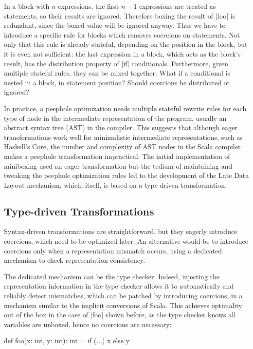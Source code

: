 In a block with $n$ expressions, the first $n-1$ expressions are treated as statements, so their results are ignored. Therefore boxing the result of |foo| is redundant, since the boxed value will be ignored anyway. Thus we have to introduce a specific rule for blocks which removes coercions on statements. Not only that this rule is already stateful, depending on the position in the block, but it is even not sufficient: the last expression in a block, which acts as the block's result, has the distribution property of |if| conditionals. Furthermore, given multiple stateful rules, they can be mixed together: What if a conditional is nested in a block, in statement position? Should coercions be distributed or ignored?

In practice, a peephole optimization needs multiple stateful rewrite rules for each type of node in the intermediate representation of the program, usually an abstract syntax tree (AST) in the compiler. This suggests that although eager transformations work well for minimalistic intermediate representations, such as Haskell's Core, the number and complexity of AST nodes in the Scala compiler makes a peephole transformation impractical. The initial implementation of miniboxing \cite{miniboxing} used an eager transformation but the tedium of maintaining and tweaking the peephole optimization rules led to the development of the Late Data Layout mechanism, which, itself, is based on a type-driven transformation.

\subsection{Type-driven Transformations}
\label{sec:problem/lazy}

Syntax-driven transformations are straightforward, but they eagerly introduce coercions, which need to be optimized later. An alternative would be to introduce coercions only when a representation mismatch occurs, using a dedicated mechanism to check representation consistency.

The dedicated mechanism can be the type checker. Indeed, injecting the representation information in the type checker allows it to automatically and reliably detect mismatches, which can be patched by introducing coercions, in a mechanism similar to the implicit conversions of Scala. This achieves optimality out of the box in the case of |foo| shown before, as the type checker knows all variables are unboxed, hence no coercions are necessary:

\begin{lstlisting-nobreak}
 def foo(x: int, y: int): int =
   if (...) x else y
\end{lstlisting-nobreak}


